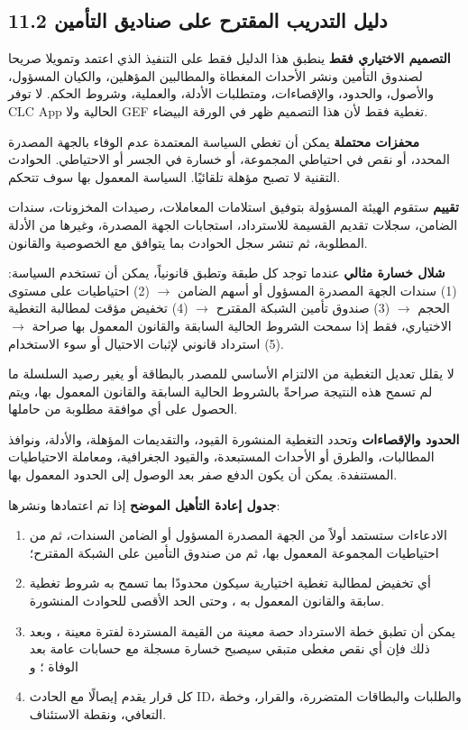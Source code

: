 \documentclass[11pt]{article}
\begin{document}
\subsection*{11.2 دليل التدريب المقترح على صناديق التأمين}

\textbf{التصميم الاختياري فقط} ينطبق هذا الدليل فقط على التنفيذ الذي اعتمد وتمويلا صريحا لصندوق التأمين ونشر الأحداث المغطاة والمطالبين المؤهلين، والكيان المسؤول، والأصول، والحدود، والإقصاءات، ومتطلبات الأدلة، والعملية، وشروط الحكم. لا توفر CLC App الحالية ولا GEF تغطية فقط لأن هذا التصميم ظهر في الورقة البيضاء.

\textbf{محفزات محتملة} يمكن أن تغطي السياسة المعتمدة عدم الوفاء بالجهة المصدرة المحدد، أو نقص في احتياطي المجموعة، أو خسارة في الجسر أو الاحتياطي. الحوادث التقنية لا تصبح مؤهلة تلقائيًا. السياسة المعمول بها سوف تتحكم.

\textbf{تقييم} ستقوم الهيئة المسؤولة بتوفيق استلامات المعاملات، رصيدات المخزونات، سندات الضامن، سجلات تقديم القسيمة للاسترداد، استجابات الجهة المصدرة، وغيرها من الأدلة المطلوبة، ثم تنشر سجل الحوادث بما يتوافق مع الخصوصية والقانون.

\textbf{شلال خسارة مثالي} عندما توجد كل طبقة وتطبق قانونياً، يمكن أن تستخدم السياسة: (1) سندات الجهة المصدرة المسؤول أو أسهم الضامن $\to$ (2) احتياطيات على مستوى الحجم $\to$ (3) صندوق تأمين الشبكة المقترح $\to$ (4) تخفيض مؤقت لمطالبة التغطية الاختياري، فقط إذا سمحت الشروط الحالية السابقة والقانون المعمول بها صراحة $\to$ (5) استرداد قانوني لإثبات الاحتيال أو سوء الاستخدام.

لا يقلل تعديل التغطية من الالتزام الأساسي للمصدر بالبطاقة أو يغير رصيد السلسلة ما لم تسمح هذه النتيجة صراحةً بالشروط الحالية السابقة والقانون المعمول بها، ويتم الحصول على أي موافقة مطلوبة من حاملها.

\textbf{الحدود والإقصاءات} وتحدد التغطية المنشورة القيود، والتقديمات المؤهلة، والأدلة، ونوافذ المطالبات، والطرق أو الأحداث المستبعدة، والقيود الجغرافية، ومعاملة الاحتياطيات المستنفدة. يمكن أن يكون الدفع صفر بعد الوصول إلى الحدود المعمول بها.

\textbf{جدول إعادة التأهيل الموضح} إذا تم اعتمادها ونشرها:

\begin{enumerate}[leftmargin=*]
\item الادعاءات ستستمد أولاً من الجهة المصدرة المسؤول أو الضامن السندات، ثم من احتياطيات المجموعة المعمول بها، ثم من صندوق التأمين على الشبكة المقترح؛
\item أي تخفيض لمطالبة تغطية اختيارية سيكون محدودًا بما تسمح به شروط تغطية سابقة والقانون المعمول به ، وحتى الحد الأقصى للحوادث المنشورة.
\item يمكن أن تطبق خطة الاسترداد حصة معينة من القيمة المستردة لفترة معينة ، وبعد ذلك فإن أي نقص مغطى متبقي سيصبح خسارة مسجلة مع حسابات عامة بعد الوفاة ؛ و
\item كل قرار يقدم إيصالًا مع الحادث ID، والطلبات والبطاقات المتضررة، والقرار، وخطة التعافي، ونقطة الاستئناف.
\end{enumerate}
\end{document}
